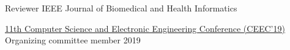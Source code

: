 

\begin{cvhonors}

\cvhonor
{Reviewer} %
{IEEE Journal of Biomedical and Health Informatics} %
{} %
{} %

\cvhonor
{\href{https://ceec.uk}{11th Computer Science and Electronic Engineering Conference (CEEC'19)}} %
{Organizing committee member} %
{} %
{2019} %

\end{cvhonors}
